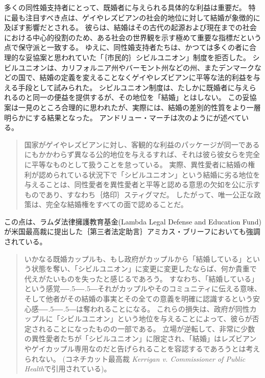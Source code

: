 \documentclass[paper=a4,book,openany]{jlreq}
\def\DDASH{―\kern-.5\zw―\kern-.5\zw―} %
\begin{document}
多くの同性婚支持者にとって、既婚者に与えられる具体的な利益は重要だ。
特に最も注目すべき点は、ゲイやレズビアンの社会的地位に対して結婚が象徴的に及ぼす影響だとされる。
彼らは、結婚はその古代の起源および現在までの社会における中心的役割のため、ある社会の世界観を示す極めて重要な指標だという点で保守派と一致する。
ゆえに、同性婚支持者たちは、かつては多くの者に合理的な妥協案と思われていた「｛市民的｝{シビル}ユニオン」制度を拒否した。
シビルユニオンは、カリフォルニア州やバーモント州などの州、またデンマークなどの国で、結婚の定義を変えることなくゲイやレズビアンに平等な法的利益を与える手段として試みられた。
シビルユニオン制度は、たしかに既婚者に与えられるのと同一の便益を提供するが、その地位を「結婚」とはしない。
この妥協案は一見のところ合理的に思われたが、実際には、結婚の差別的性質をより一層明らかにする結果となった。
アンドリュー・マーチは次のようにが述べている。

\begin{quote}
国家がゲイやレズビアンに対し、客観的な利益のパッケージが同一であるにもかかわらず異なる公的地位を与えるすれば、それは彼ら彼女らを完全に平等なものとして扱うことを怠っている。
実際、異性愛者に結婚の権利が認められている状況下で「シビルユニオン」という結婚に劣る地位を与えることは、同性愛者を異性愛者と平等と認める意思の欠如を公に示すものであり、すなわち｛烙印｝{スティグマ}だ。
したがって、唯一公正な政策は、完全な結婚権をすべての面で認めることだ。\citep[p.254]{march11:_is_there_right_polyg}
\end{quote}

この点は、ラムダ法律擁護教育基金(Lambda Legal Defense and Education Fund)が米国最高裁に提出した｛第三者法定助言｝{アミカス・ブリーフ}においても強調されている。

\begin{quote}
いかなる既婚カップルも、もし政府がカップルから「結婚している」という状態を奪い、「シビルユニオン」に変更に変更したならば、何か貴重で代えがたいものを失ったと感じるであろう。
すなわち、「結婚している」という感覚{\DDASH}それがカップルやそのコミュニティに伝える意味、そして他者がその結婚の事実とその全ての意義を明確に認識するという安心感{\DDASH}は奪われることになる。
これらの損失は、政府が同性カップルに「シビルユニオン」という地位を与えることによって、彼らが否定されることになったものの一部である。
立場が逆転して、非常に少数の異性愛者たちが「シビルユニオン」に限定され、「結婚」はレズビアンやゲイカップル専用なのだと告げられることを容認するであろうとは考えられない。
(コネチカット最高裁 \emph{Kerrigan v. Commissioner of Public Health}で引用されている)。
\end{quote}
\end{document}
